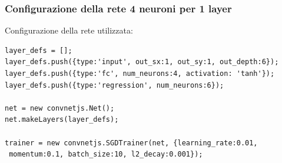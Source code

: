 \subsubsection{Configurazione della rete 4 neuroni per 1 layer}
\label{Configurazione della rete 4 neuroni per 1 layer}

Configurazione della rete utilizzata:\\
\begin{verbatim}layer_defs = [];
layer_defs.push({type:'input', out_sx:1, out_sy:1, out_depth:6});
layer_defs.push({type:'fc', num_neurons:4, activation: 'tanh'});
layer_defs.push({type:'regression', num_neurons:6});

net = new convnetjs.Net();
net.makeLayers(layer_defs);

trainer = new convnetjs.SGDTrainer(net, {learning_rate:0.01,
 momentum:0.1, batch_size:10, l2_decay:0.001});
\end{verbatim}


